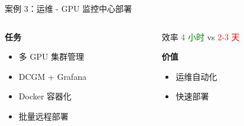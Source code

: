 \documentclass[aspectratio=169,xcolor=dvipsnames]{beamer}
\begin{document}
\begin{frame}{案例 3：运维 - GPU 监控中心部署}
  \begin{columns}
    \begin{column}{0.48\textwidth}
      \textbf{任务}
      \begin{itemize}
        \item 多 GPU 集群管理
        \item DCGM + Grafana
        \item Docker 容器化
        \item 批量远程部署
      \end{itemize}
    \end{column}
    \begin{column}{0.48\textwidth}
      \begin{exampleblock}{效率}
        \textcolor{green}{4 小时} vs \textcolor{red}{2-3 天}
      \end{exampleblock}

      \vspace{0.3cm}

      \textbf{价值}
      \begin{itemize}
        \item 运维自动化
        \item 快速部署
      \end{itemize}
    \end{column}
  \end{columns}
\end{frame}
\end{document}
